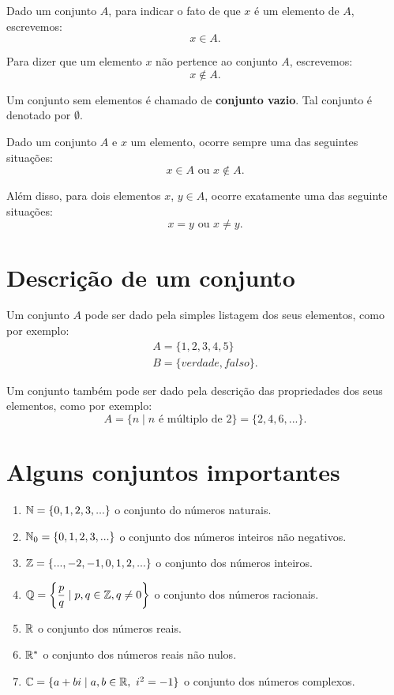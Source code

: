 Dado um conjunto $A$, para indicar o fato de que $x$ {\'e} um elemento de $A$, escrevemos:
\[
x \in A.
\]

Para dizer que um elemento $x$ n{\~a}o pertence ao conjunto $A$, escrevemos:
\[
x \notin A.
\]

Um conjunto sem elementos {\'e} chamado de \textbf{conjunto vazio}. Tal conjunto {\'e} denotado por $\emptyset$.

Dado um conjunto $A$ e $x$ um elemento, ocorre sempre uma das seguintes situa\c{c}\~oes:
\[
x \in A \mbox{ ou } x \notin A.
\]

Al{\'e}m disso, para dois elementos $x$, $y \in A$, ocorre exatamente uma das seguinte situa\c{c}\~oes:
\[
x = y \mbox{ ou } x \neq y.
\]

\section{Descri{\c c}{\~a}o de um conjunto}

Um conjunto $A$ pode ser dado pela simples listagem dos seus elementos, como por exemplo:
\begin{align*}
	A= \{1,2,3,4,5\}\\
	B = \{verdade, falso\}.
\end{align*}

Um conjunto tamb{\'e}m pode ser dado pela descri{\c c}{\~a}o das propriedades dos seus elementos, como por exemplo:
\[
A = \{n \mid n \mbox{ \'e m{\'u}ltiplo de } 2\} = \{2,4,6,...\}.
\]

\section{Alguns conjuntos importantes}
\begin{enumerate}[label={\arabic*})]
	\item $\mathbb{N} = \{0,1,2,3,...\}$ o conjunto do n{\'u}meros naturais.
	\item $\mathbb{N}_0 = \{0,1,2,3,...\}$ o conjunto dos n{\'u}meros inteiros n{\~a}o negativos.
	\item $\mathbb{Z} = \{...,-2,-1,0,1,2,...\}$ o conjunto dos n{\'u}meros inteiros.
	\item $\mathbb{Q} = \left\{\dfrac{p}{q} \mid p,q \in \mathbb{Z}, q \neq 0 \right\}$ o conjunto dos n{\'u}meros racionais.
	\item $\mathbb{R} $ o conjunto dos n{\'u}meros reais.
	\item $\mathbb{R}^*$ o conjunto dos n{\'u}meros reais n{\~a}o nulos.
	\item $\mathbb{C} = \{a + bi \mid a,b \in \mathbb{R},\ i^2 = -1\}$ o conjunto dos números complexos.
\end{enumerate}

